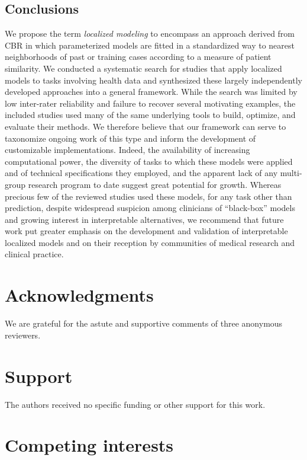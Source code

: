 \documentclass[preprint, 3p,
authoryear]{elsarticle} %
\begin{document}
\hypertarget{conclusions}{%
\subsection{Conclusions}\label{conclusions}}

We propose the term \emph{localized modeling} to encompass an approach
derived from CBR in which parameterized models are fitted in a
standardized way to nearest neighborhoods of past or training cases
according to a measure of patient similarity. We conducted a systematic
search for studies that apply localized models to tasks involving health
data and synthesized these largely independently developed approaches
into a general framework. While the search was limited by low
inter-rater reliability and failure to recover several motivating
examples, the included studies used many of the same underlying tools to
build, optimize, and evaluate their methods. We therefore believe that
our framework can serve to taxonomize ongoing work of this type and
inform the development of customizable implementations. Indeed, the
availability of increasing computational power, the diversity of tasks
to which these models were applied and of technical specifications they
employed, and the apparent lack of any multi-group research program to
date suggest great potential for growth. Whereas precious few of the
reviewed studies used these models, for any task other than prediction,
despite widespread suspicion among clinicians of ``black-box'' models
and growing interest in interpretable alternatives, we recommend that
future work put greater emphasis on the development and validation of
interpretable localized models and on their reception by communities of
medical research and clinical practice.

\hypertarget{acknowledgments}{%
\section{Acknowledgments}\label{acknowledgments}}

We are grateful for the astute and supportive comments of three
anonymous reviewers.

\hypertarget{support}{%
\section{Support}\label{support}}

The authors received no specific funding or other support for this work.

\hypertarget{competing-interests}{%
\section{Competing interests}\label{competing-interests}}
\end{document}
